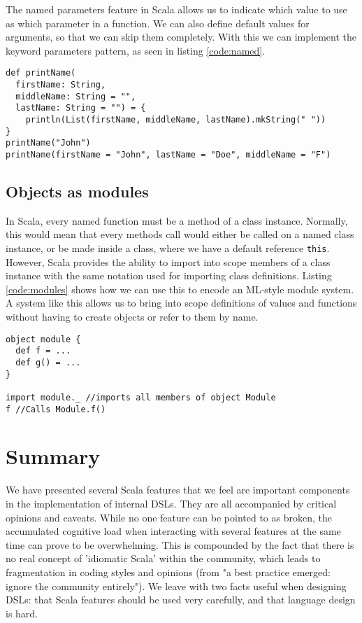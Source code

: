 The named parameters feature in Scala allows us to indicate which value to use as which parameter in a function. We can also define default values for arguments, so that we can skip them completely. With this we can implement the keyword parameters pattern, as seen in listing \ref{code:named}.

\begin{lstlisting}[caption=Named parameters \& default arguments, label=code:named]
def printName(
  firstName: String,
  middleName: String = "",
  lastName: String = "") = {
    println(List(firstName, middleName, lastName).mkString(" "))
}
printName("John")
printName(firstName = "John", lastName = "Doe", middleName = "F")
\end{lstlisting}

\subsection{Objects as modules}

In Scala, every named function must be a method of a class instance. Normally, this would mean that every methods call would either be called on a named class instance, or be made inside a class, where we have a default reference \texttt{this}. However, Scala provides the ability to import into scope members of a class instance with the same notation used for importing class definitions. Listing \ref{code:modules} shows how we can use this to encode an ML-style module system. A system like this allows us to bring into scope definitions of values and functions without having to create objects or refer to them by name.

\begin{lstlisting}[caption=Modules, label=code:modules, float]
object module {
  def f = ...
  def g() = ...
}

import module._ //imports all members of object Module
f //Calls Module.f()
\end{lstlisting}

\section{Summary}

We have presented several Scala features that we feel are important components in the implementation of internal DSLs. They are all accompanied by critical opinions and caveats. While no one feature can be pointed to as broken, the accumulated cognitive load when interacting with several features at the same time can prove to be overwhelming. This is compounded by the fact that there is no real concept of 'idiomatic Scala' within the community, which leads to fragmentation in coding styles and opinions (from \cite{Hale:2011} "a best practice emerged: ignore the community entirely"). We leave with two facts useful when designing DSLs: that Scala features should be used very carefully, and that language design is hard.
